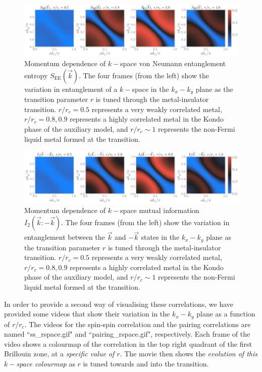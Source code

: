 \documentclass[reprint,hidelinks]{revtex4-2}
\begin{document}
\begin{widetext}
\begin{figure}[!htb]
\includegraphics[width=\textwidth]{vne_kspace_all.pdf}
\caption{Momentum dependence of \(k-\)space von Neumann entanglement entropy \(S_\text{EE}(\vec k)\). The four frames (from the left) show the variation in entanglement of a \(k-\)space in the \(k_x-k_y\) plane as the transition parameter \(r\) is tuned through the metal-insulator transition. \(r/r_c=0.5\) represents a very weakly correlated metal, \(r/r_c=0.8,0.9\) represents a highly correlated metal in the Kondo phase of the auxiliary model, and \(r/r_c \sim 1\) represents the non-Fermi liquid metal formed at the transition.}
\label{entanglement_kspace}
\end{figure}

\begin{figure}[!htb]
\includegraphics[width=\textwidth]{mutinfo_kspace_all.pdf}
\caption{Momentum dependence of \(k-\)space mutual information \(I_2(\vec k: -\vec k)\). The four frames (from the left) show the variation in entanglement between the \(\vec k\) and \(-\vec k\) states in the \(k_x-k_y\) plane as the transition parameter \(r\) is tuned through the metal-insulator transition. \(r/r_c=0.5\) represents a very weakly correlated metal, \(r/r_c=0.8,0.9\) represents a highly correlated metal in the Kondo phase of the auxiliary model, and \(r/r_c \sim 1\) represents the non-Fermi liquid metal formed at the transition.}
\label{mutinfo_kspace}
\end{figure}

{\color{blue} In order to provide a second way of visualising these correlations, we have provided some videos that show their variation in the \(k_x-k_y\) plane as a function of \(r/r_c\). The videos for the spin-spin correlation and the pairing correlations are named ``ss\_rspace.gif" and ``pairing\_rspace.gif", respectively. Each frame of the video shows a colourmap of the correlation in the top right quadrant of the first Brillouin zone, at a {\it specific value of \(r\)}. The movie then shows the {\it evolution of this \(k-\)space colourmap} as \(r\) is tuned towards and into the transition.}


\end{widetext}
\end{document}
